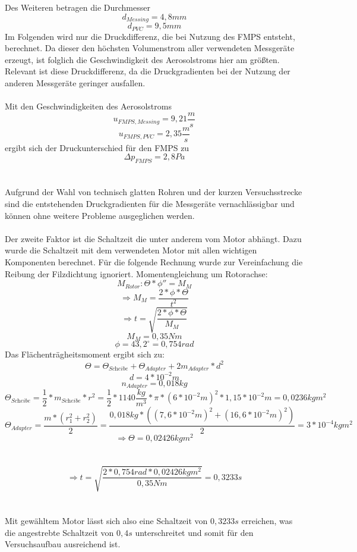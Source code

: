 Des Weiteren betragen die Durchmesser
\[d_{Messing} = 4,8 mm\]
\[d_{PVC} = 9,5 mm\]
Im Folgenden wird nur die Druckdifferenz, die bei Nutzung des  FMPS entsteht, berechnet. Da dieser den h\"{o}chsten Volumenstrom aller verwendeten Messger\"{a}te erzeugt, ist folglich die Geschwindigkeit des Aerosolstroms hier am gr\"{o}{\ss}ten. Relevant ist diese Druckdifferenz, da die Druckgradienten bei der Nutzung der anderen Messger\"{a}te geringer ausfallen.
\\\\
Mit den Geschwindigkeiten des Aerosolstroms \[u_{FMPS, Messing} = 9,21 \frac{m}{s}\] \[u_{FMPS, PVC} = 2,35 \frac{m}{s}\] ergibt sich der Druckunterschied f\"{u}r den FMPS zu \[\Delta p_{FMPS} = 2,8 Pa\]
\\\\
Aufgrund der Wahl von technisch glatten Rohren und der kurzen Versuchsstrecke sind die entstehenden Druckgradienten f\"{u}r die Messger\"{a}te vernachl\"{a}ssigbar und k\"{o}nnen ohne weitere Probleme ausgeglichen werden.
\\\\
Der zweite Faktor ist die Schaltzeit die unter anderem vom Motor abh\"{a}ngt. Dazu wurde die Schaltzeit mit dem verwendeten Motor mit allen wichtigen Komponenten berechnet. F\"{u}r die folgende Rechnung wurde zur Vereinfachung die Reibung der Filzdichtung ignoriert.
Momentengleichung um Rotorachse:
\[M_\textit{Rotor}: \Theta * \phi'' = M_M\]
\[\Rightarrow M_M = \frac{2*\phi*\Theta}{t^2}\]
\[\Rightarrow t = \sqrt{\frac{2*\phi*\Theta}{M_M}}\]
\[M_M = 0,35Nm\]
\[\phi = 43,2^\circ = 0,754 \textit{rad}\]
Das Fl\"{a}chentr\"{a}gheitsmoment ergibt sich zu:
\[\Theta = \Theta_\textit{Scheibe} + \Theta_{Adapter} + 2m_\textit{Adapter} * d^2\]
\[d = 4 * 10^{-2}m\]
\[n_\textit{Adapter} = 0,018kg\]
\[\Theta_\textit{Scheibe} = \frac{1}{2}*m_\textit{Scheibe} * r^2 = \frac{1}{2} * 1140\frac{kg}{m^3}*\pi *(6*10^{-2}m)^2 * 1,15 * 10^{-2}m = 0,0236kgm^2\]
\[\Theta_\textit{Adapter} = \frac{m*(r_1^2+r_2^2)}{2} = \frac{0,018kg * ((7,6*10^{-2}m)^2+(16,6*10^{-2}m)^2)}{2} = 3*10^{-4}kgm^2\]
\[\Rightarrow \Theta = 0,02426kgm^2\]
\\\\
\[\Rightarrow t = \sqrt{\frac{2*0,754\textit{rad}*0,02426 kgm^2}{0,35Nm}} = 0,3233s\]
\\\\
Mit gew\"{a}hltem Motor l\"{a}sst sich also eine Schaltzeit von \(0,3233s\) erreichen, was die angestrebte Schaltzeit von \(0,4s\) unterschreitet und somit f\"{u}r den Versuchsaufbau ausreichend ist.\\

